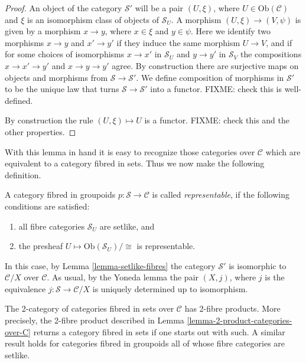 \begin{proof}
An object of the category $\mathcal{S}'$ will be a pair $(U, \xi)$, where
$U \in \text{Ob}(\mathcal{C})$ and $\xi$ is an isomorphism class of objects
of $\mathcal{S}_U$. A morphism $(U,\xi) \to (V , \psi)$ is given by a 
morphism $x \to y$, where $x \in \xi$ and $y \in \psi$. Here we identify
two morphisms $x \to y$ and $x' \to y'$ if they induce the same morphism
$U \to V$, and if for some choices of isomorphisms $x \to x'$ in
$\mathcal{S}_U$ and $y \to y'$ in $\mathcal{S}_V$ the compositions
$x \to x' \to y'$ and $x \to y \to y'$ agree. By construction there are
surjective maps on objects and morphisms from $\mathcal{S} \to
\mathcal{S}'$. We define composition of morphisms in $\mathcal{S}'$ to
be the unique law that turns $\mathcal{S} \to \mathcal{S}'$ into a functor.
FIXME: check this is well-defined. 

\medskip\noindent
By construction the rule $(U,\xi) \mapsto U$ is a functor. FIXME: check this
and the other properties.
\end{proof}

\noindent
With this lemma in hand it is easy to recognize those categories over
$\mathcal{C}$ which are equivalent to a category fibred in sets. Thus we
now make the following definition.

\begin{definition}
\label{definition-representable-fibred-category}
A category fibred in groupoids $p : \mathcal{S} \to \mathcal{C}$ is
called {\it representable}, if the following conditions are satisfied:
\begin{enumerate}
\item all fibre categories $\mathcal{S}_U$ are setlike, and
\item the presheaf $U \mapsto \text{Ob}(\mathcal{S}_U)/\cong$ is 
representable.
\end{enumerate}
\end{definition}

\noindent
In this case, by Lemma \ref{lemma-setlike-fibres} the category 
$\mathcal{S}'$ is isomorphic to $\mathcal{C}/X$ over $\mathcal{C}$.
As usual, by the Yoneda lemma the pair $(X,j)$, where $j$ is the
equivalence $j : \mathcal{S} \to \mathcal{C}/X$ is uniquely determined
up to isomorphism.

\begin{lemma}
\label{lemma-2-product-categories-fibred-sets}
The 2-category of categories fibred in sets over $\mathcal{C}$
has 2-fibre products. More precisely, the 2-fibre product described in 
Lemma \ref{lemma-2-product-categories-over-C} returns a category fibred in
sets if one starts out with such. A similar result holds for categories
fibred in groupoids all of whose fibre categories are setlike.
\end{lemma}

